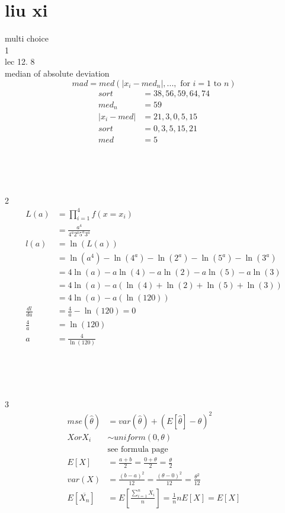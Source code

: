 \documentclass[12pt,border=4pt,multi]{article} %
\begin{document}
\section*{liu xi}
multi choice\\
1\\
lec 12. 8\\
median of absolute deviation
\[mad = med(|x_i - med_n|, ..., \text{ for } i = 1 \text{ to } n)\]
\begin{align*}
sort &= 38, 56, 59, 64, 74\\
med_n &= 59\\
|x_i - med| &= 21, 3, 0, 5, 15\\
sort &= 0, 3, 5, 15, 21\\
med &= 5\\
\end{align*}
\\
\\
\\
\\
2
\begin{align*}
L(a) &= \prod_{i = 1}^4 f(x = x_i)\\
&= \frac{a^4}{4^a 2^a 5^a 3^a}\\
l(a) &= \ln(L(a))\\
&= \ln(a^4) - \ln(4^a) - \ln(2^a) - \ln(5^a) - \ln(3^a)\\
&= 4\ln(a) - a\ln(4) - a\ln(2) - a\ln(5) - a\ln(3)\\
&= 4\ln(a) - a(\ln(4) + \ln(2) + \ln(5) + \ln(3))\\
&= 4\ln(a) - a(\ln(120))\\
\frac{dl}{da} &= \frac{4}{a} - \ln(120) = 0\\
\frac{4}{a} &= \ln(120)\\
a &= \frac{4}{\ln(120)}\\
\end{align*}
\\
\\
\\
\\
3
\begin{align*}
mse(\hat{\theta}) &= var(\hat{\theta}) + (E[\hat{\theta}] - \theta)^2\\
X or X_i &\sim uniform(0, \theta)\\
&\text{see formula page}\\
E[X] &= \frac{a + b}{2} = \frac{0 + \theta}{2} = \frac{\theta}{2}\\
var(X) &= \frac{(b - a)^2}{12} = \frac{(\theta - 0)^2}{12} = \frac{\theta^2}{12}\\
E[\overline{X_n}] &= E\left[\frac{\sum_{i = 1}^n X_i}{n}\right] = \frac{1}{n}nE[X] = E[X]\\
\end{align*}
\end{document}
